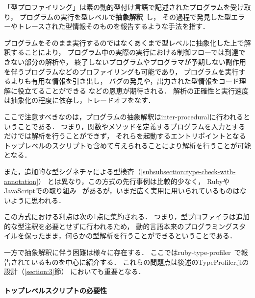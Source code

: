 「型プロファイリング」は素の動的型付け言語で記述されたプログラムを受け取り，
プログラムの実行を型レベルで\textbf{抽象解釈}~\cite{abstract-interpretation, scheme-for-automatic-inference}し，
その過程で発見した型エラーやトレースされた型情報そのものを報告するような手法を指す．

プログラムをそのまま実行するのではなくあくまで型レベルに抽象化した上で解釈することにより，
プログラム中の実際の実行における制御フローでは到達できない部分の解析や，
終了しないプログラムやプログラマが予期しない副作用を伴うプログラムなどのプロファイリングも可能であり，
プログラムを実行するよりも有用な情報を引き出し，
バグの発見や，出力された型情報をコード理解に役立てることができる
などの恩恵が期待される\footnotemark[\value{footnote}]．
解析の正確性と実行速度は抽象化の程度に依存し，トレードオフをなす．

ここで注意すべきなのは，プログラムの抽象解釈はinter-proceduralに行われるということである．
つまり，関数やメソッドを定義するプログラムを入力とするだけでは解析を行うことができず，
それらを起動するエントリポイントとなるトップレベルのスクリプトも含めて与えられることにより解析を行うことが可能となる．


また，追加的な型シグネチャによる型検査（\ref{subsubsection:type-check-with-annotation}）
とは異なり，この方式の先行事例は比較的少なく，
RubyやJavaScriptでの取り組み~\cite{ruby-type-profiler, type-analysis-for-javascript, type-inference-for-javascript}
があるが，いまだ広く実用に用いられているものはないように思われる．\

この方式における利点は次の1点に集約される．
つまり，型プロファイラは追加的な型注釈を必要とせずに行われるため，
動的言語本来のプログラミングスタイルを保ったまま，何らかの型解析を行うことができるということである．

一方で抽象解釈に伴う困難は様々に存在する．
ここではruby-type-profiler~\cite{ruby-progress-report, ruby-type-profiler}で報告されているものを中心に紹介する．
これらの問題点は後述のTypeProfiler.jlの設計（\ref{section:3}節）
においても重要となる．

\paragraph{トップレベルスクリプトの必要性}

